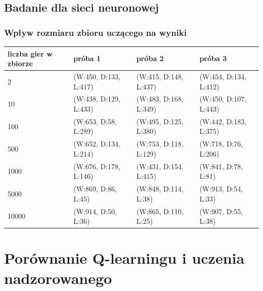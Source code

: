 \documentclass{article}
\begin{document}
\subsection{Badanie dla sieci neuronowej}

\subsubsection{Wpływ rozmiaru zbioru uczącego na wyniki}

\begin{center}
  \begin{tabular}{|l|l|l|l|}
    \hline
    liczba gier w zbiorze & próba 1 & próba 2 & próba 3 \\ \hline
    2 & (W:450, D:133, L:417) & (W:415, D:148, L:437) & (W:454, D:134, L:412) \\ \hline
    10 & (W:438, D:129, L:433) & (W:483, D:168, L:349) & (W:450, D:107, L:443) \\ \hline
    100 & (W:653, D:58, L:289) & (W:495, D:125, L:380) & (W:442, D:183, L:375) \\ \hline
    500 & (W:652, D:134, L:214) & (W:753, D:118, L:129) & (W:718, D:76, L:206) \\ \hline
    1000 & (W:676, D:178, L:146) & (W:431, D:154, L:415) & (W:841, D:78, L:81) \\ \hline
    5000 & (W:869, D:86, L:45) & (W:848, D:114, L:38) & (W:913, D:54, L:33) \\ \hline
    10000 & (W:914, D:50, L:36) & (W:865, D:110, L:25) & (W:907, D:55, L:38) \\ \hline
  \end{tabular}
\end{center}


\section{Porównanie Q-learningu i uczenia nadzorowanego}
\end{document}
